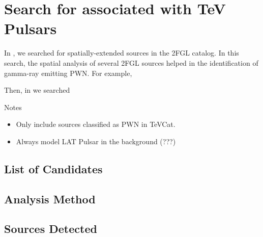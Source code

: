 
\chapter{Search for  associated with TeV Pulsars}

In , we searched for spatially-extended
sources in the 2FGL catalog. 
In this search, the spatial analysis of several 2FGL sources
helped in the identification of gamma-ray emitting
\ac{PWN}. For example, 

Then, in 
we searched

Notes 
\begin{itemize}
  \item Only include sources classified as PWN in TeVCat.
  \item Always model LAT Pulsar in the background (???)
\end{itemize}

\section{List of Candidates}

\section{Analysis Method}

\section{Sources Detected}
